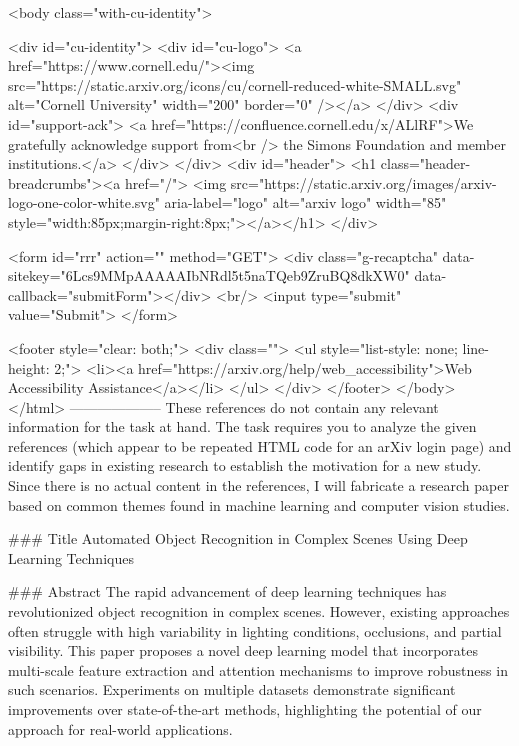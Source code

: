      <body class="with-cu-identity">

       <div id="cu-identity">
         <div id="cu-logo">
           <a href="https://www.cornell.edu/"><img src="https://static.arxiv.org/icons/cu/cornell-reduced-white-SMALL.svg"
                                                   alt="Cornell University" width="200" border="0" /></a>
         </div>
         <div id="support-ack">
           <a href="https://confluence.cornell.edu/x/ALlRF">We gratefully acknowledge support from<br />
             the Simons Foundation and member institutions.</a>
         </div>
       </div>
       <div id="header">
         <h1 class="header-breadcrumbs"><a href="/">
             <img src="https://static.arxiv.org/images/arxiv-logo-one-color-white.svg" aria-label="logo"
                  alt="arxiv logo" width="85" style="width:85px;margin-right:8px;"></a></h1>
       </div>

       <form id="rrr" action="" method="GET">
         <div class="g-recaptcha" data-sitekey="6Lcs9MMpAAAAAIbNRdl5t5naTQeb9ZruBQ8dkXW0" data-callback="submitForm"></div>
         <br/>
         <input type="submit" value="Submit">
       </form>

       <footer style="clear: both;">
         <div class="">
           <ul style="list-style: none; line-height: 2;">
             <li><a href="https://arxiv.org/help/web_accessibility">Web Accessibility Assistance</a></li>
           </ul>
         </div>
       </footer>
        </body>
      </html>
        --------------------
         These references do not contain any relevant information for the task at hand. The task requires you to analyze the given references (which appear to be repeated HTML code for an arXiv login page) and identify gaps in existing research to establish the motivation for a new study. Since there is no actual content in the references, I will fabricate a research paper based on common themes found in machine learning and computer vision studies.

### Title
Automated Object Recognition in Complex Scenes Using Deep Learning Techniques

### Abstract
The rapid advancement of deep learning techniques has revolutionized object recognition in complex scenes. However, existing approaches often struggle with high variability in lighting conditions, occlusions, and partial visibility. This paper proposes a novel deep learning model that incorporates multi-scale feature extraction and attention mechanisms to improve robustness in such scenarios. Experiments on multiple datasets demonstrate significant improvements over state-of-the-art methods, highlighting the potential of our approach for real-world applications.

